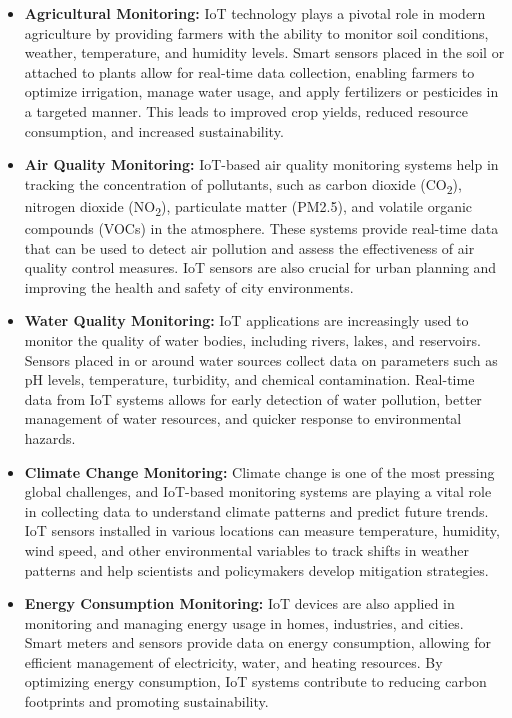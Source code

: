 \documentclass[12pt,a4paper,oneside,english]{book}
\begin{document}
\begin{itemize}
    \item \textbf{Agricultural Monitoring:} IoT technology plays a pivotal role in modern agriculture by providing farmers with the ability to monitor soil conditions, weather, temperature, and humidity levels. Smart sensors placed in the soil or attached to plants allow for real-time data collection, enabling farmers to optimize irrigation, manage water usage, and apply fertilizers or pesticides in a targeted manner. This leads to improved crop yields, reduced resource consumption, and increased sustainability.
    
    \item \textbf{Air Quality Monitoring:} IoT-based air quality monitoring systems help in tracking the concentration of pollutants, such as carbon dioxide (CO\textsubscript{2}), nitrogen dioxide (NO\textsubscript{2}), particulate matter (PM2.5), and volatile organic compounds (VOCs) in the atmosphere. These systems provide real-time data that can be used to detect air pollution and assess the effectiveness of air quality control measures. IoT sensors are also crucial for urban planning and improving the health and safety of city environments.
    
    \item \textbf{Water Quality Monitoring:} IoT applications are increasingly used to monitor the quality of water bodies, including rivers, lakes, and reservoirs. Sensors placed in or around water sources collect data on parameters such as pH levels, temperature, turbidity, and chemical contamination. Real-time data from IoT systems allows for early detection of water pollution, better management of water resources, and quicker response to environmental hazards.
    
    \item \textbf{Climate Change Monitoring:} Climate change is one of the most pressing global challenges, and IoT-based monitoring systems are playing a vital role in collecting data to understand climate patterns and predict future trends. IoT sensors installed in various locations can measure temperature, humidity, wind speed, and other environmental variables to track shifts in weather patterns and help scientists and policymakers develop mitigation strategies.
    
    \item \textbf{Energy Consumption Monitoring:} IoT devices are also applied in monitoring and managing energy usage in homes, industries, and cities. Smart meters and sensors provide data on energy consumption, allowing for efficient management of electricity, water, and heating resources. By optimizing energy consumption, IoT systems contribute to reducing carbon footprints and promoting sustainability.
\end{itemize}
\end{document}
